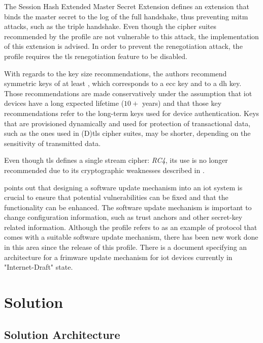 \documentclass{llncs}
\begin{document}
The Session Hash Extended Master Secret Extension\cite{RFC7627} defines an extension
that binds the master secret to the log of the full handshake, thus preventing
\gls{mitm} attacks, such as the triple handshake\cite{TripleHa89:online}. Even though the
cipher suites recommended by the profile are not vulnerable to this attack, the
implementation of this extension is advised. In order to prevent the renegotiation
attack\cite{RFC5746}, the profile requires the \gls{tls} renegotiation feature
to be disabled.

With regards to the key size recommendations, the authors recommend symmetric keys
of at least , which corresponds to a  \gls{ecc}
key and to a  \gls{dh} key. Those recommendations are made
conservatively under the assumption that \gls{iot} devices have a long expected
lifetime ($10+$ years) and that those key recommendations refer to the long-term
keys used for device authentication. Keys that are provisioned dynamically
and used for protection of transactional data, such as the ones used in
(D)\gls{tls} cipher suites, may be shorter, depending on the sensitivity of
transmitted data.

Even though \gls{tls} defines a single stream cipher: \textit{RC4}, its use is no longer
recommended due to its cryptographic weaknesses described in \cite{RFC7465}.

\cite{RFC7925} points out that designing a software
update mechanism into an \gls{iot} system is crucial to ensure that potential vulnerabilities
can be fixed and that the functionality can be enhanced. The software update mechanism
is important to change configuration information, such as trust anchors and
other secret-key related information. Although the profile refers to \cite{OpenMobi29:online}
as an example of protocol that comes with a suitable software update mechanism,
there has been new work done in this area since the release of this profile.
There is a document specifying an architecture for a frimware update
mechanism for \gls{iot} devices\cite{I-D.moran-suit-architecture} currently in "Internet-Draft" state.

\section{Solution}

\subsection{Solution Architecture}
\end{document}
